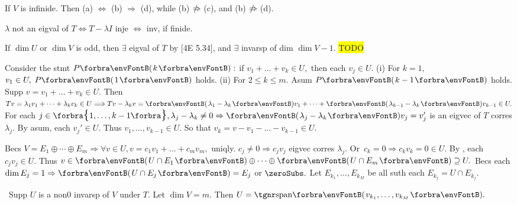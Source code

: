 
\vspace{6pt}

\BulletPointX\NoteForSmall{[5.6]}\;\;If $V$ is infinide. Then (a) $\Longleftrightarrow$ (b) $\Rightarrow$ (d), while (b) $\notRightarrow$(c), and (b) $\notRightarrow$(d).\par
\BulletPointX\AComm $\lambda$ not an eigval of $T\Longleftrightarrow{T-\lambda I}$ inje $\Longleftrightarrow$ inv, if finide.
\SepLine

If $\dim U$ or $\dim V$ is odd, then $\exists$ eigval of $T$ by [4E 5.34], and $\exists$ invarsp of dim $\dim V-1.$\parSol{}
\colorbox{yellow}{TODO}\parSol{}
\parSol{}
\SepLine

Consider the stmt $P\Par{k}:$ if $v_1+\dots+v_k\in U,$ then each $v_j\in U.$\parSol{}
(i) For $k=1,$ $v_1\in U,\;P\Par{1}$ holds.\parSol{\Endi}
(ii) For $2\leqslant k\leqslant m.$ Asum $P\Par{k-1}$ holds. Supp $v=v_1+\dots+v_k\in U.$\parSol{\Hii}
Then $Tv=\lambda_1v_1+\dots+\lambda_k v_k\in U\Longrightarrow Tv-\lambda_k v=\Par{\lambda_1-\lambda_k}v_1+\dots+\Par{\lambda_{k-1}-\lambda_k}v_{k-1}\in U.$\parSol{\Hii}
For each $j\in\Bra{1,\dots,k-1},\lambda_j-\lambda_{k}\neq 0\Rightarrow\Par{\lambda_j-\lambda_k}v_j=v_j'$ is an eigvec of $T$ corres $\lambda_j.$\parSol{\Hii}
By asum, each $v_j'\in U.$ Thus $v_1,\dots,v_{k-1}\in U.$ So that $v_k=v-v_1-\dots-v_{k-1}\in U.$\PfEnd
\SepLine[0pt][\Blind{\BulletPointX} ]

Becs $V=E_1\oplus\cdots\oplus E_m\Rightarrow\forall v\in U,v=c_1v_1+\dots+c_mv_m,$ uniqly.\vspace{-1pt}\parSol{}
$c_j\neq 0\Rightarrow c_jv_j$ eigvec corres $\lambda_j.$ Or \,$c_k=0\Rightarrow c_kv_k=0\in U.$\vspace{1pt}\parSol{}
By , each $c_jv_j\in U.$ Thus $v\in\Par{U\cap E_1}\oplus\dots\oplus\Par{U\cap E_m}\supseteq U.$\PfEnd\vspace{2pt}
\ACoro Becs each $\dim E_j=1\Rightarrow\Par{U\cap E_j}=E_j$ or $\zeroSubs.$ Let $E_{k_1},\dots,E_{k_M}$ be all suth each $E_{k_j}=U\cap E_{k_j}.$\par
{}\BulletPointX{}\,\,\,{\tgsl Supp $U$ is a non0 invarsp of $V$ under $T.$ Let $\dim V=m.$ Then $U=\Span{v_{k_1},\dots,v_{k_M}}.$}
\SepLine

